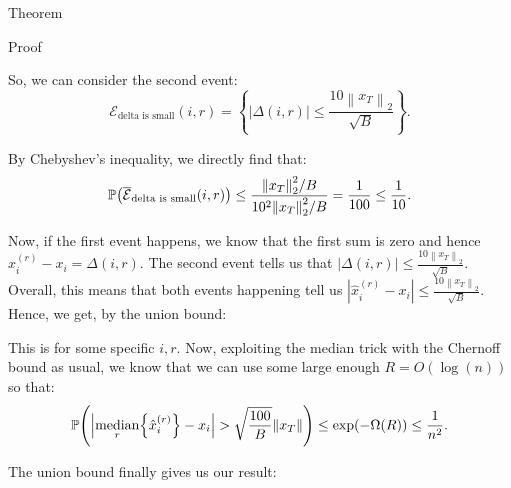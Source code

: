 \documentclass[a4paper]{article}
\begin{document}
\begin{parag}{Theorem}
\begin{subparag}{Proof}
\begin{enumerate}[left=0pt]
        So, we can consider the second event:
        \[\mathcal{E}_{\text{delta is small}}\left(i, r\right) = \left\{\left|\Delta\left(i, r\right)\right| \leq \frac{10 \left\|x_T\right\|_2}{\sqrt{B}}\right\}.\]

        By Chebyshev's inequality, we directly find that: 
        \[\prob\left(\bar{\mathcal{E}}_{\text{delta is small}}\left(i, r\right)\right) \leq \frac{\left\|x_T\right\|_2^2 / B}{10^2 \left\|x_T\right\|_2^2 / B} = \frac{1}{100} \leq \frac{1}{10}.\]
        
        \end{enumerate}

        Now, if the first event happens, we know that the first sum is zero and hence $\hat{x}_i^{\left(r\right)} - x_i = \Delta\left(i, r\right)$. The second event tells us that $\left|\Delta\left(i, r\right)\right| \leq \frac{10 \left\|x_T\right\|_2}{\sqrt{B}}$. Overall, this means that both events happening tell us $\left|\hat{x}_i^{\left(r\right)} - x_i\right| \leq \frac{10 \left\|x_T\right\|_2}{\sqrt{B}}$. Hence, we get, by the union bound: 

        This is for some specific $i, r$. Now, exploiting the median trick with the Chernoff bound as usual, we know that we can use some large enough $R = O\left(\log\left(n\right)\right)$ so that:
        \[\prob\left(\left|\median_r\left\{\hat{x}_i^{\left(r\right)}\right\} - x_i\right| > \sqrt{\frac{100}{B}} \left\|x_T\right\|\right) \leq \exp\left(-\Omega\left(R\right)\right) \leq \frac{1}{n^2}.\]
                
        The union bound finally gives us our result:



\end{subparag}
\end{parag}
\end{document}
